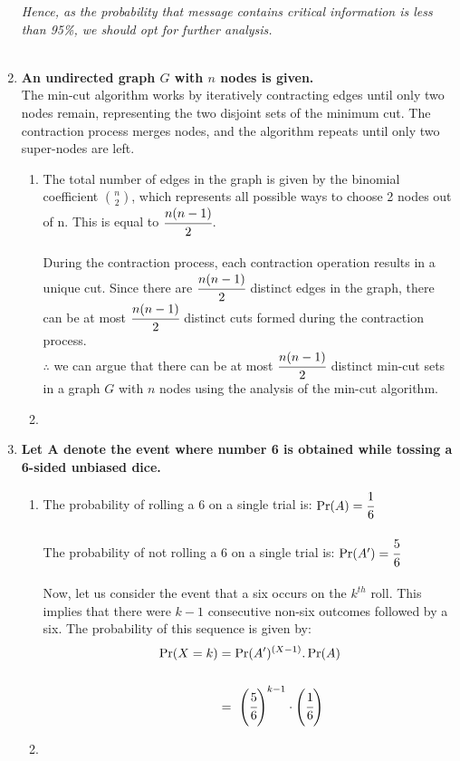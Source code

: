 \documentclass{article}
\begin{document}
\begin{enumerate}
  \textit{Hence, as the probability that message contains critical information is less than 95\%, we should opt for further analysis.}\\\\
\newpage
\item \textbf{An undirected graph $G$ with $n$ nodes is given.}\\
  \textnormal{The min-cut algorithm works by iteratively contracting edges until only two nodes remain, representing the two disjoint sets of the minimum cut. The contraction process merges nodes, and the algorithm repeats until only two super-nodes are left.}\\
  \begin{enumerate}
    \item \textnormal{The total number of edges in the graph is given by the binomial coefficient \( \binom{n}{2} \), which represents all possible ways to choose 2 nodes out of n. This is equal to \(\cfrac{n(n-1)}{2}\).}\\\\
    \textnormal{During the contraction process, each contraction operation results in a unique cut. Since there are \(\cfrac{n(n-1)}{2}\) distinct edges in the graph, there can be at most \(\cfrac{n(n-1)}{2}\) distinct cuts formed during the contraction process.}\\
    \(\therefore\)  we can argue that there can be at most \(\cfrac{n(n-1)}{2}\) distinct min-cut sets in a graph $G$ with $n$ nodes using the analysis of the min-cut algorithm.\\
    \item 
  \end{enumerate}
\newpage
\item \textbf{Let A denote the event where number 6 is obtained while tossing a 6-sided unbiased dice.}\\
  \begin{enumerate}
    \item \textnormal{The probability of rolling a 6 on a single trial is: \(\Pr(A) = \cfrac{1}{6}\)}\\\\
    \textnormal{The probability of not rolling a 6 on a single trial is: \(\Pr(A') = \cfrac{5}{6}\)}\\\\
    Now, let us consider the event that a six occurs on the \(k^{th}\) roll. This implies that there were \(k-1\) consecutive non-six outcomes followed by a six. The probability of this sequence is given by:
    \begin{align*}
      \Pr(X = k) & = \Pr(A')^{(X-1)}.\Pr(A)\\\\
      & =\ \left(\cfrac{5}{6}\right)^{k-1}\cdot \left(\cfrac{1}{6}\right)\\
    \end{align*}
    \item 
  \end{enumerate}
\end{enumerate}
\end{document}
